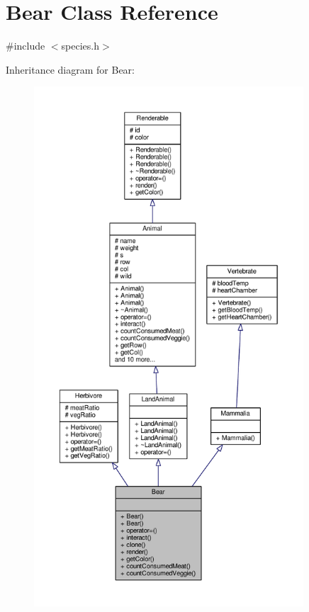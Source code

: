 \hypertarget{classBear}{}\section{Bear Class Reference}
\label{classBear}


{\ttfamily \#include $<$species.\+h$>$}



Inheritance diagram for Bear\+:
\nopagebreak
\begin{figure}[H]
\begin{center}
\leavevmode
\includegraphics[height=550pt]{classBear__inherit__graph}
\end{center}
\end{figure}


